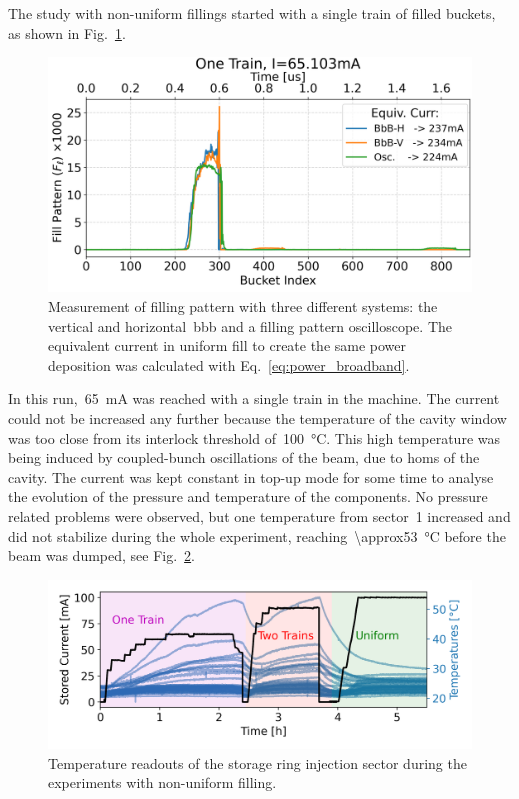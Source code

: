 \documentclass
[
    a4paper,
    nospread,     %
]{jacow}
\begin{document}
    The study with non-uniform fillings started with a single train of filled buckets, as shown in Fig.~\ref{fig:2023-08-01_onetrain_fill}.
    \begin{figure}
        \centering
        \includegraphics[width=0.95\columnwidth]{THPC44_f3.png}
        \caption{Measurement of filling pattern with three different systems: the vertical and horizontal~\gls{bbb} and a filling pattern oscilloscope. The equivalent current in uniform fill to create the same power deposition was calculated with Eq.~\eqref{eq:power_broadband}.}
        \label{fig:2023-08-01_onetrain_fill}
    \end{figure}
    In this run,~\SI{65}{\milli\ampere} was reached with a single train in the machine. The current could not be increased any further because the temperature of the cavity window was too close from its interlock threshold of~\SI{100}{\celsius}. This high temperature was being induced by coupled-bunch oscillations of the beam, due to \glspl{hom} of the cavity. The current was kept constant in top-up mode for some time to analyse the evolution of the pressure and temperature of the components. No pressure related problems were observed, but one temperature from sector~\num{1} increased and did not stabilize during the whole experiment, reaching~\SI{\approx53}{\celsius} before the beam was dumped, see Fig.~\ref{fig:temps_sector1}.
        \begin{figure}
        \centering
        \includegraphics[width=0.95\columnwidth]{THPC44_f4.png}
        \caption{Temperature readouts of the storage ring injection sector during the experiments with non-uniform filling.}
        \label{fig:temps_sector1}
    \end{figure}
\end{document}
